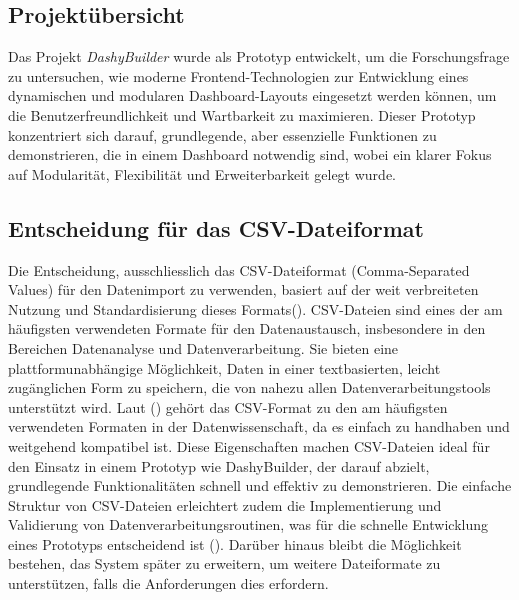 \documentclass[a4paper, 12pt]{scrartcl}
\begin{document}
{\subsection{Projektübersicht}}

Das Projekt \textit{DashyBuilder} wurde als Prototyp entwickelt, um die Forschungsfrage zu untersuchen, wie moderne Frontend-Technologien zur Entwicklung eines dynamischen und modularen Dashboard-Layouts eingesetzt werden können, um die Benutzerfreundlichkeit und Wartbarkeit zu maximieren. Dieser Prototyp konzentriert sich darauf, grundlegende, aber essenzielle Funktionen zu demonstrieren, die in einem Dashboard notwendig sind, wobei ein klarer Fokus auf Modularität, Flexibilität und Erweiterbarkeit gelegt wurde.

\subsection{Entscheidung für das CSV-Dateiformat}
Die Entscheidung, ausschliesslich das CSV-Dateiformat (Comma-Separated Values) für den Datenimport zu verwenden, basiert auf der weit verbreiteten Nutzung und Standardisierung dieses Formats(\cite{Connelly2014}). CSV-Dateien sind eines der am häufigsten verwendeten Formate für den Datenaustausch, insbesondere in den Bereichen Datenanalyse und Datenverarbeitung. Sie bieten eine plattformunabhängige Möglichkeit, Daten in einer textbasierten, leicht zugänglichen Form zu speichern, die von nahezu allen Datenverarbeitungstools unterstützt wird. Laut (\cite{Burg2019}) gehört das CSV-Format zu den am häufigsten verwendeten Formaten in der Datenwissenschaft, da es einfach zu handhaben und weitgehend kompatibel ist. Diese Eigenschaften machen CSV-Dateien ideal für den Einsatz in einem Prototyp wie DashyBuilder, der darauf abzielt, grundlegende Funktionalitäten schnell und effektiv zu demonstrieren. Die einfache Struktur von CSV-Dateien erleichtert zudem die Implementierung und Validierung von Datenverarbeitungsroutinen, was für die schnelle Entwicklung eines Prototyps entscheidend ist (\cite{Tapsai2018}). Darüber hinaus bleibt die Möglichkeit bestehen, das System später zu erweitern, um weitere Dateiformate zu unterstützen, falls die Anforderungen dies erfordern.
\end{document}
